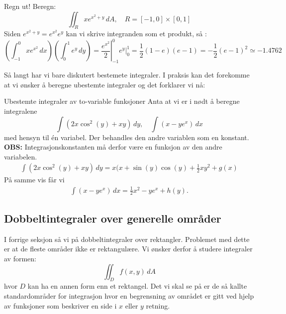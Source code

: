 \begin{eks}{Regn ut!}
Beregn:
\[
\iint_R  x e^{x^2 +y} \, dA, \quad R = [-1, 0] \times \left[0, 1\right]
\]
Siden $e^{x^2+y}=e^{x^2}e^y$ kan vi skrive integranden som et produkt, så :
\[
\left( \int_{-1}^{0} xe^{x^2} \, dx \right) \left( \int_0^{1} e^y \, dy \right) = \left.\frac{e^{x^2}}{2}\right|_{-1}^0 \left.e^y\right|_0^{1} = \frac{1}{2}(1-e)(e-1)=-\frac{1}{2}(e-1)^2 \simeq -1.4762
\]
\end{eks}

Så langt har vi bare diskutert bestemete integraler. I praksis kan det forekomme at vi ønsker å beregne ubestemte integraler og det forklarer vi nå:
\begin{eks}{Ubestemte integraler av to-variable funksjoner}
Anta at vi er i nødt å beregne integralene 
\[
\int (2x \cos^2(y) + xy) \, dy, \quad \int (x - ye^{x}) \, dx
\]
med hensyn til én variabel. Der behandles den andre variablen som en konstant. \textbf{OBS:} Integrasjonskonstanten må derfor være en funksjon av den andre variabelen.
\begin{align*}
\int (2x\cos^2 (y) + xy) \, dy = x(x+\sin(y)\cos(y) + \frac{1}{2}x y^2 + g(x)
\end{align*} 
På samme vis får vi
\begin{align*}
\int (x - ye^{x}) \, dx = \tfrac{1}{2} x^2 - y e^{x} + h(y).
\end{align*}
\end{eks}
\subsection{Dobbeltintegraler over generelle områder}

I forrige seksjon så vi på dobbeltintegraler over rektangler. Problemet med dette er at de fleste områder ikke er rektangulære. Vi ønsker derfor å studere integraler av formen:
\[
\iint_D f(x, y)\, dA
\]
hvor \( D \) kan ha en annen form enn et rektangel. Det vi skal se på er de så kallte standardområder for integrasjon hvor en begrensning av området er gitt ved hjelp av funksjoner som beskriver en side i $x$ eller $y$ retning. 


